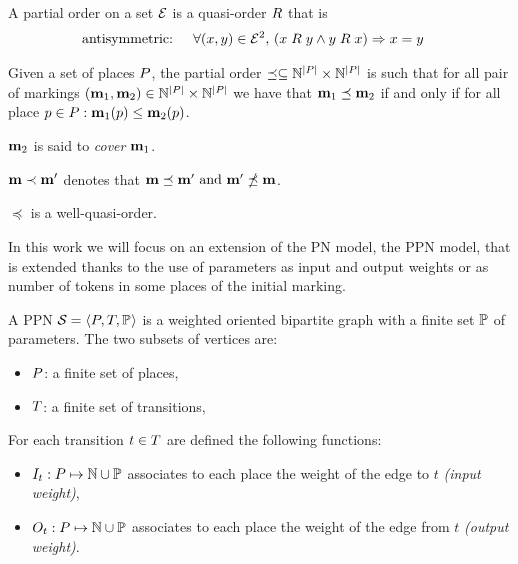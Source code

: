 \begin{defi}
  A partial order on a set $\mathcal{E}$ is a quasi-order $\mathrel{R}$ that is
  \begin{align*}
    \text{antisymmetric: } &&\forall (x, y) \in \mathcal{E}^2,\ & (x \mathrel{R} y\land y \mathrel{R} x)\Rightarrow x = y
  \end{align*}
\end{defi}

\begin{defi}
  Given a set of places $P$, the partial order \(\preceq \subseteq \mathbb{N}^{\left|P\right|} \times \mathbb{N}^{\left|P\right|}\) is such that for all pair of markings \((\mathbf{m}_1, \mathbf{m}_2) \in \mathbb{N}^{\left|P\right|} \times \mathbb{N}^{\left|P\right|}\) we have that \(\mathbf{m}_1 \preceq \mathbf{m}_2\) if and only if for all place \(p \in P : \mathbf{m}_1(p) \leq \mathbf{m}_2(p)\).

  $\mathbf{m}_2$ is said to \emph{cover} $\mathbf{m}_1$.
\end{defi}

\(\mathbf{m} \prec \mathbf{m'}\) denotes that \(\mathbf{m} \preceq \mathbf{m'} \text{ and } \mathbf{m'} \npreceq \mathbf{m}\).

\begin{lemm}
  \label{lemm:wqo}
  $\preceq$ is a well-quasi-order.
\end{lemm}

In this work we will focus on an extension of the \ac{PN} model, the \ac{PPN} model, that is extended thanks to the use of parameters as input and output weights or as number of tokens in some places of the initial marking.

\begin{defi}
  A \acf{PPN} $\mathcal{S}_{{}} = \left\langle P_{}, T_{}, \mathbb{P}_{}\right\rangle$ is a weighted oriented bipartite graph with a finite set $\mathbb{P}$ of parameters. The two subsets of vertices are:
  \begin{itemize}
    \item $P$: a finite set of places,
    \item $T$: a finite set of transitions,
  \end{itemize}
  For each transition $t \in T$ are defined the following functions:
  \begin{itemize}
    \item $\inw[t] : P \mapsto \naturals \cup \parameters$ associates to each place the weight of the edge to $t$ \emph{(input weight)},
    \item $\outw[t] : P \mapsto \naturals \cup \parameters$ associates to each place the weight of the edge from $t$ \emph{(output weight)}.
  \end{itemize}
\end{defi}

